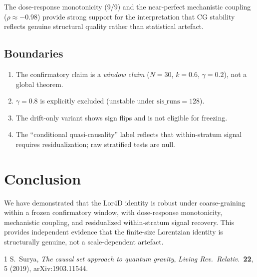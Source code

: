 \documentclass[12pt,a4paper]{article}
\newcommand{\Lor}{\mathrm{Lor4D}}
\begin{document}
The dose-response monotonicity (9/9) and the near-perfect mechanistic coupling
($\rho\approx -0.98$) provide strong support for the interpretation that CG
stability reflects genuine structural quality rather than statistical artefact.

\subsection{Boundaries}

\begin{enumerate}
\item The confirmatory claim is a \emph{window claim} ($N=30$, $k=0.6$,
  $\gamma=0.2$), not a global theorem.
\item $\gamma=0.8$ is explicitly excluded (unstable under $\text{sis\_runs}=128$).
\item The drift-only variant shows sign flips and is not eligible for freezing.
\item The ``conditional quasi-causality'' label reflects that within-stratum
  signal requires residualization; raw stratified tests are null.
\end{enumerate}

\section{Conclusion}

We have demonstrated that the $\Lor$ identity is robust under coarse-graining
within a frozen confirmatory window, with dose-response monotonicity,
mechanistic coupling, and residualized within-stratum signal recovery.
This provides independent evidence that the finite-size Lorentzian identity is
structurally genuine, not a scale-dependent artefact.

\begin{thebibliography}{1}
S.~Surya,
\emph{The causal set approach to quantum gravity},
\emph{Living Rev.\ Relativ.}\ \textbf{22}, 5 (2019),
arXiv:1903.11544.
\end{thebibliography}
\end{document}
